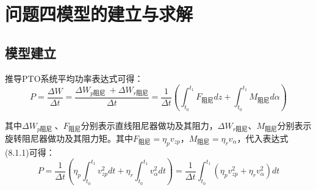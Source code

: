 \documentclass{article}
\numberwithin{equation}{subsection}
\begin{document}
\newpage







{\centering\section{问题四模型的建立与求解}}

\subsection{模型建立}
推导PTO系统平均功率表达式可得：
\begin{equation}
P=\frac{\Delta W}{\Delta t}=\frac{\Delta W_{p\text {阻尼 }}+\Delta W_{r\text {阻尼}}}{\Delta t}=\frac{1}{\Delta t}\left(\int_{t_0}^{t_1} F_{\text{阻尼}} d z+\int_{t_0}^{t_1} M_{\text{阻尼}} d \alpha \right)
\end{equation}

其中$\Delta W_{p\text {阻尼 }}$、$ F_{\text{阻尼}}$分别表示直线阻尼器做功及其阻力，$\Delta W_{r\text {阻尼}}$、$M_{\text{阻尼}}$分别表示旋转阻尼器做功及其阻力矩。其中$F_{\text{阻尼}}=\eta _p v_{zp}，M_{\text{阻尼}}=\eta _r v_{\alpha}$，代入表达式(8.1.1)可得：
\begin{equation}
P=\frac{1}{\Delta t}\left(\eta_{p} \int_{t_{0}}^{t_{1}} v_{zp}^{2} d t+\eta_{r} \int_{t_{0}}^{t_{1}} v_{\alpha}^{2} d t\right)    =   \frac{1}{\Delta t} \int_{t_{0}}^{t_{1}}\left(\eta_{p} v_{zp}^{2}+\eta_{r} v_{\alpha}^{2}\right) d t
\end{equation}
\end{document}
